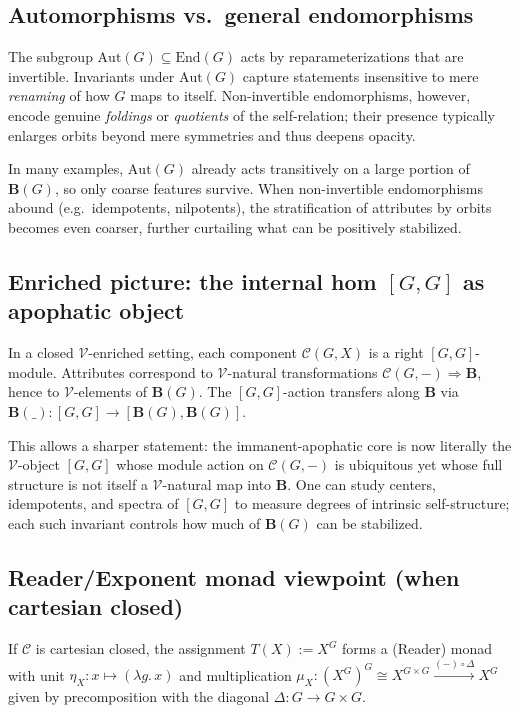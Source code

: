 \documentclass[11pt]{article}
\theoremstyle{upright}
\begin{document}
\subsection{Automorphisms vs.\ general endomorphisms}
The subgroup \(\mathrm{Aut}(G)\subseteq\mathrm{End}(G)\) acts by reparameterizations that are invertible. Invariants under \(\mathrm{Aut}(G)\) capture statements insensitive to mere \emph{renaming} of how \(G\) maps to itself. Non-invertible endomorphisms, however, encode genuine \emph{foldings} or \emph{quotients} of the self-relation; their presence typically enlarges orbits beyond mere symmetries and thus deepens opacity.

In many examples, \(\mathrm{Aut}(G)\) already acts transitively on a large portion of \(\mathbf B(G)\), so only coarse features survive. When non-invertible endomorphisms abound (e.g.\ idempotents, nilpotents), the stratification of attributes by orbits becomes even coarser, further curtailing what can be positively stabilized.

\subsection{Enriched picture: the internal hom \texorpdfstring{$[G,G]$}{[G,G]} as apophatic object}
In a closed \(\mathcal V\)-enriched setting, each component \(\mathcal C(G,X)\) is a right \([G,G]\)-module. Attributes correspond to \(\mathcal V\)-natural transformations \(\mathcal C(G,-)\Rightarrow \mathbf B\), hence to \(\mathcal V\)-elements of \(\mathbf B(G)\). The \([G,G]\)-action transfers along \(\mathbf B\) via \(\mathbf B(\_):[G,G]\to [\mathbf B(G),\mathbf B(G)]\).

This allows a sharper statement: the immanent-apophatic core is now literally the \(\mathcal V\)-object \([G,G]\) whose module action on \(\mathcal C(G,-)\) is ubiquitous yet whose full structure is not itself a \(\mathcal V\)-natural map into \(\mathbf B\). One can study centers, idempotents, and spectra of \([G,G]\) to measure degrees of intrinsic self-structure; each such invariant controls how much of \(\mathbf B(G)\) can be stabilized.

\subsection{Reader/Exponent monad viewpoint (when cartesian closed)}

If \(\mathcal C\) is cartesian closed, the assignment $T(X):=X^{G}$ forms a (Reader) monad with unit $\eta_X:x\mapsto (\lambda g.\,x)$ and multiplication 
$\mu_X:(X^{G})^{G}\cong X^{G\times G}\xrightarrow{(-)\circ \Delta}X^{G}$ given by precomposition with the diagonal $\Delta:G\to G\times G$.
\end{document}
